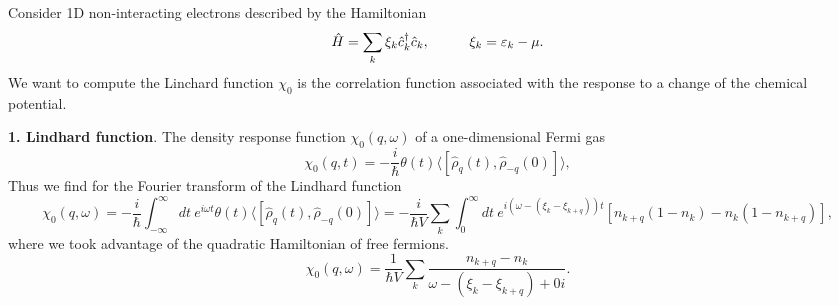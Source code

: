 Consider 1D non-interacting electrons described by the Hamiltonian
\begin{equation*}
	\hat{H} = \sum_k \xi_k \hat{c}_k\D \hat{c}_k,
	\hspace{10 mm} 
	\xi_k = \varepsilon_k - \mu.
\end{equation*}
We want to compute the Linchard function $\chi_0$
is the
correlation function
associated
with the
response
to
a
change
of the
chemical
potential.


\textbf{1. Lindhard function}.  The density response function $\chi_0(q, \omega)$ of a one-dimensional Fermi gas 
\begin{equation*}
	\chi_0(q, t) = - \frac{i}{\hbar} \theta(t) \langle [\hat{\rho}_q(t), \hat{\rho}_{-q} (0)]\rangle,
\end{equation*}
Thus we find for the Fourier transform of the Lindhard function	
\begin{equation*}
	\chi_0 (q, \omega) = - \frac{i}{\hbar} \int_{-\infty}^{\infty} dt \ 
	e^{i \omega t} \theta(t) \langle [\hat{\rho}_q(t), \hat{\rho}_{-q} (0)]\rangle = - \frac{i}{\hbar V} \sum_k \int_{0}^{\infty} dt\ 
	e^{i(\omega - (\xi_k - \xi_{k+q}))t} \left[
		n_{k+q} (1-n_k) - n_k (1 - n_{k+q})
	\right],
\end{equation*}
where we took advantage of the quadratic Hamiltonian of free fermions. 
\begin{equation*}
	\chi_0 (q, \omega) = \frac{1}{\hbar V} \sum_k \frac{n_{k+q} - n_k}{\omega- (\xi_k - \xi_{k+q}) + 0 i}.
\end{equation*}
